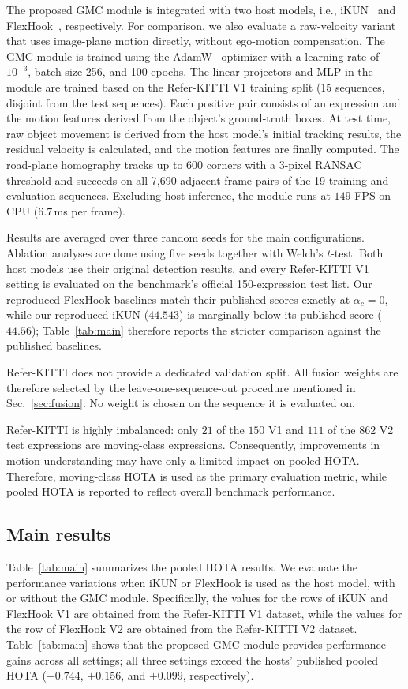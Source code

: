 \documentclass{article}
\begin{document}
The proposed GMC module is integrated with two host models, i.e., iKUN~\cite{ikun} and FlexHook~\cite{flexhook}, respectively. For comparison, we also evaluate a raw-velocity variant that uses image-plane motion directly, without ego-motion compensation. The GMC module is trained using the AdamW~\cite{adamw} optimizer with a learning rate of $10^{-3}$, batch size 256, and 100 epochs. The linear projectors and MLP in the module are trained based on the Refer-KITTI V1 training split (15 sequences, disjoint from the test sequences). Each positive pair consists of an expression and the motion features derived from the object's ground-truth boxes. At test time, raw object movement is derived from the host model's initial tracking results, the residual velocity is calculated, and the motion features are finally computed. The road-plane homography tracks up to 600 corners with a 3-pixel RANSAC threshold and succeeds on all 7,690 adjacent frame pairs of the 19 training and evaluation sequences. Excluding host inference, the module runs at $149$ FPS on CPU ($6.7$\,ms per frame).

Results are averaged over three random seeds for the main configurations. Ablation analyses are done using five seeds together with Welch's $t$-test. Both host models use their original detection results, and every Refer-KITTI V1 setting is evaluated on the benchmark's official 150-expression test list. Our reproduced FlexHook baselines match their published scores exactly at $\alpha_c{=}0$, while our reproduced iKUN ($44.543$) is marginally below its published score ($44.56$); Table~\ref{tab:main} therefore reports the stricter comparison against the published baselines.

Refer-KITTI does not provide a dedicated validation split. All fusion weights are therefore selected by the leave-one-sequence-out procedure mentioned in Sec.~\ref{sec:fusion}. No weight is chosen on the sequence it is evaluated on.

Refer-KITTI is highly imbalanced: only $21$ of the $150$ V1 and $111$ of the $862$ V2 test expressions are moving-class expressions. Consequently, improvements in motion understanding may have only a limited impact on pooled HOTA. Therefore, moving-class HOTA is used as the primary evaluation metric, while pooled HOTA is reported to reflect overall benchmark performance.

\subsection{Main results}
\label{sec:main}
Table~\ref{tab:main} summarizes the pooled HOTA results. We evaluate the performance variations when iKUN or FlexHook is used as the host model, with or without the GMC module. Specifically, the values for the rows of iKUN and FlexHook V1 are obtained from the Refer-KITTI V1 dataset, while the values for the row of FlexHook V2 are obtained from the Refer-KITTI V2 dataset. Table~\ref{tab:main} shows that the proposed GMC module provides performance gains across all settings; all three settings exceed the hosts' published pooled HOTA ($+0.744$, $+0.156$, and $+0.099$, respectively).
\end{document}
